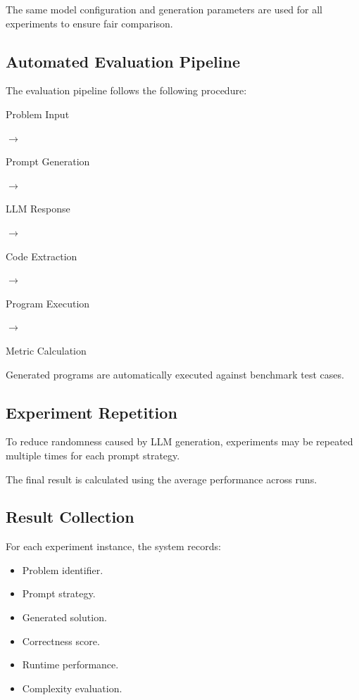The same model configuration and generation parameters are used for all
experiments to ensure fair comparison.



\subsection{Automated Evaluation Pipeline}


The evaluation pipeline follows the following procedure:


\begin{center}

Problem Input

$\rightarrow$

Prompt Generation

$\rightarrow$

LLM Response

$\rightarrow$

Code Extraction

$\rightarrow$

Program Execution

$\rightarrow$

Metric Calculation

\end{center}



Generated programs are automatically executed against benchmark test cases.



\subsection{Experiment Repetition}


To reduce randomness caused by LLM generation, experiments may be repeated
multiple times for each prompt strategy.


The final result is calculated using the average performance across runs.



\subsection{Result Collection}


For each experiment instance, the system records:


\begin{itemize}

\item Problem identifier.

\item Prompt strategy.

\item Generated solution.

\item Correctness score.

\item Runtime performance.

\item Complexity evaluation.

\end{itemize}



